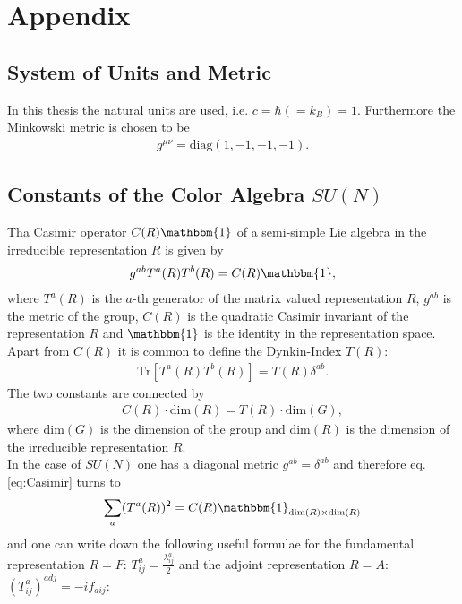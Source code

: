 \section{Appendix}


\subsection{System of Units and Metric}
In this thesis the natural units are used, i.e. $c= \hbar (= k_B) = 1$. Furthermore the Minkowski metric is chosen to be
\begin{align}
g^{\mu\nu} = \mathrm{diag}(1, -1, -1, -1).
\end{align}


\subsection{Constants of the Color Algebra $SU(N)$}\label{sec:coloralgebra}
Tha Casimir operator $C(R)\mathbbm{1}$ of a semi-simple Lie algebra in the irreducible representation $R$ is given by\cite{Marina}
\begin{align}
g^{ab} T^a(R)T^b(R) = C(R)\mathbbm{1}, \label{eq:Casimir}
\end{align}
where $T^a(R)$ is the $a$-th generator of the matrix valued representation $R$, $g^{ab}$ is the metric of the group, $C(R)$ is the quadratic Casimir invariant of the representation $R$ and $\mathbbm{1}$ is the identity in the representation space.\\
Apart from $C(R)$ it is common to define the Dynkin-Index $T(R)$:
\begin{align}
\mathrm{Tr}\left[T^a(R)T^b(R)\right] = T(R)\delta^{ab}.
\end{align}
The two constants are connected by
\begin{align}
C(R) \cdot \mathrm{dim}(R) = T(R) \cdot \mathrm{dim}(G),
\end{align}
where $\mathrm{dim}(G)$ is the dimension of the group and $\mathrm{dim}(R)$ is the dimension of the irreducible representation $R$.\\
In the case of $SU(N)$ one has a diagonal metric $g^{ab} = \delta^{ab}$ and therefore eq. \ref{eq:Casimir} turns to
\begin{align}
\sum_a (T^a(R))^2 = C(R)\mathbbm{1}_{\mathrm{dim}(R) \times \mathrm{dim}(R)}
\end{align}
and one can write down the following useful formulae for the fundamental representation $R=F$: $T^a_{ij} = \frac{\lambda^a_{ij}}{2}$ and the adjoint representation $R=A$: $(T^a_{ij})^{adj} = -if_{aij}$:
